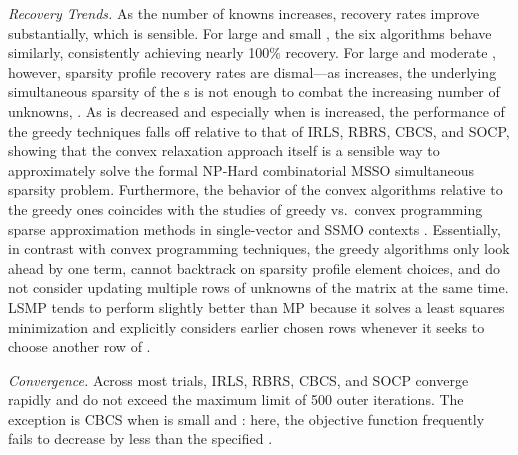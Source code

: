 \documentclass[final]{siamltex}
\begin{document}
   {\em{Recovery Trends}.} As the number of knowns  increases,
   recovery rates improve substantially, which is sensible.  For large
    and small , the six algorithms behave similarly,
   consistently achieving nearly 100\% recovery.  For large  and
   moderate , however, sparsity profile recovery rates are
   dismal---as  increases, the underlying simultaneous sparsity of
   the s is not enough to combat the increasing number of
   unknowns, .  As  is decreased and especially when  is
   increased, the performance of the greedy techniques falls off
   relative to that of IRLS, RBRS, CBCS, and SOCP, showing that the
   convex relaxation approach itself is a sensible way to
   approximately solve the formal NP-Hard combinatorial MSSO
   simultaneous sparsity problem.  Furthermore, the behavior of the
   convex algorithms relative to the greedy ones coincides with the
   studies of greedy vs.~convex programming sparse approximation
   methods in single-vector \cite{Che1998, Cot1999} and SSMO contexts
   \cite{Cot2005}.  Essentially, in contrast with convex programming
   techniques, the greedy algorithms only look ahead by one term,
   cannot backtrack on sparsity profile element choices, and do not
   consider updating multiple rows of unknowns of the  matrix
   at the same time.  LSMP tends to perform slightly better than MP
   because it solves a least squares minimization and explicitly
   considers earlier chosen rows whenever it seeks to choose another
   row of .

   {\em{Convergence}.} Across most trials, IRLS, RBRS, CBCS, and SOCP
   converge rapidly and do not exceed the maximum limit of 500 outer
   iterations.  The exception is CBCS when  is small and :
   here, the objective function frequently fails to decrease by less
   than the specified .
\end{document}
